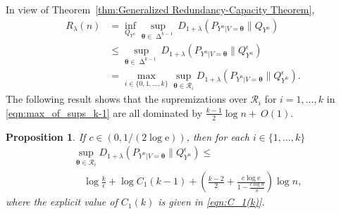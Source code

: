 \documentclass[journal, 10pt]{IEEEtran}
\newcommand{\rme}{\mathrm{e}}
\newcommand{\cR}{\mathcal{R}}
\theoremstyle{plain}
\theoremstyle{plain}
\theoremstyle{plain}
\newtheorem{prop}{Proposition}%
\theoremstyle{plain}
\newcommand{\boldtheta}{\mathbold{\theta}}
\newcommand{\simplex}{\operatorname{\Delta}}
\begin{document}
In view of Theorem~\ref{thm:Generalized Redundancy-Capacity Theorem},
\begin{align}
R_\lambda (n)&=
\inf_{Q_{Y^n}}\sup_{\boldtheta\in \simplex^{k-1}}D_{1+\lambda}(P_{Y^n|V=\boldtheta}\|Q_{Y^n}) \\
&\le
\sup _{\boldtheta \in \simplex^{k-1} }D_{1+\lambda }( P_{Y^n|V=\boldtheta} \| Q_{Y^n}^{\epsilon}) \\
&=
\max_{i\in \{0,1, \hdots, k \}}    
\sup _{\boldtheta \in \cR_i}  D_{1+\lambda }(P_{Y^n|V=\boldtheta} \| Q_{Y^n}^{\epsilon})\text{.}  \label{eqn:max_of_sups_k-1}
\end{align}
The following result shows that the supremizations over $\cR_i$ for $i=1, \hdots, k$ in \eqref{eqn:max_of_sups_k-1} are all dominated by $\tfrac{k-1}{2}\log n +~O(1)$.
\begin{prop}\label{prop:achievability-general-faces dont matter}
If $c\in (0, 1/(2\log \rme))$, then for each $i\in \{1, \hdots, k \}$
\begin{align}
&\sup_{\boldtheta \in \cR_i}D_{1+\lambda}(P_{Y^n|V=\boldtheta} \| Q_{Y^n}^{\epsilon}) \le  \\&
\quad \log \frac{k}{\epsilon} + \log C_1(k-1) +  \left(\frac{k-2}{2}+\frac{c\log \rme }{1-\frac{c\log n }{n}} \right) \log n\text{,} \nonumber
\end{align}
where the explicit value of $C_1(k)$ is given in \eqref{eqn:C_1(k)}.
\end{prop}
\end{document}
